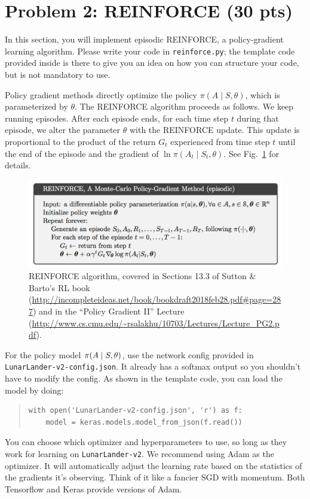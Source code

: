 \documentclass[12pt]{article}
\begin{document}
\newpage
\section*{Problem 2: REINFORCE (30 pts)}

In this section, you will implement episodic REINFORCE, a policy-gradient learning algorithm. Please write your code in \texttt{reinforce.py}; the template code provided inside is there to give you an idea on how you can structure your code, but is not mandatory to use.

Policy gradient methods directly optimize the policy $\pi(A \mid S, \theta)$, which is parameterized by $\theta$. The REINFORCE algorithm proceeds as follows. We keep running episodes. After each episode ends, for each time step $t$ during that episode, we alter the parameter $\theta$ with the REINFORCE update. This update is proportional to the product of the return $G_t$ experienced from time step $t$ until the end of the episode and the gradient of $\ln \pi(A_t \mid S_t, \theta)$. See Fig.~\ref{REINFORCE} for details.

\begin{center}\begin{figure}[h]
\includegraphics[width=\textwidth]{REINFORCE.png}
\caption{\label{REINFORCE} REINFORCE algorithm, covered in Sections 13.3 of Sutton \& Barto's RL book (\url{http://incompleteideas.net/book/bookdraft2018feb28.pdf\#page=287}) and in the ``Policy Gradient II'' Lecture (\url{http://www.cs.cmu.edu/~rsalakhu/10703/Lectures/Lecture\_PG2.pdf}).}
\end{figure}
\end{center}

For the policy model $\pi(A \mid S, \bf{\theta})$, use the network config provided in \\\texttt{LunarLander-v2-config.json}. It already has a softmax output so you shouldn't have to modify the config. As shown in the template code, you can load the model by doing:
\begin{quote}
\begin{verbatim}
with open('LunarLander-v2-config.json', 'r') as f:
    model = keras.models.model_from_json(f.read())
\end{verbatim}
\end{quote}
You can choose which optimizer and hyperparameters to use, so long as they work for learning on \texttt{LunarLander-v2}. We recommend using Adam as the optimizer. It will automatically adjust the learning rate based on the statistics of the gradients it's observing. Think of it like a fancier SGD with momentum. Both Tensorflow and Keras provide versions of Adam.
\end{document}
